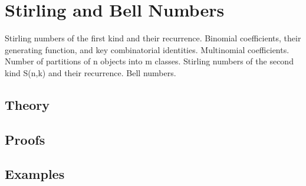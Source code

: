 
\section{Stirling and Bell Numbers}
\label{sec:2.2.07-stirling-bell}

\begin{ticket}
Stirling numbers of the first kind and their recurrence. Binomial coefficients, their generating function, and key combinatorial identities. Multinomial coefficients. Number of partitions of n objects into m classes. Stirling numbers of the second kind S(n,k) and their recurrence. Bell numbers.
\end{ticket}

\subsection*{Theory}

\subsection*{Proofs}

\subsection*{Examples}
